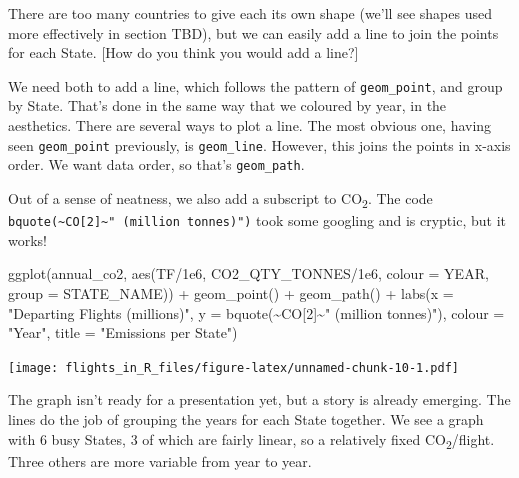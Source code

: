 \documentclass[
]{book}
\newenvironment{Shaded}{\begin{snugshade}}{\end{snugshade}}
\newcommand{\AttributeTok}[1]{\textcolor[rgb]{0.77,0.63,0.00}{#1}}
\newcommand{\DecValTok}[1]{\textcolor[rgb]{0.00,0.00,0.81}{#1}}
\newcommand{\FloatTok}[1]{\textcolor[rgb]{0.00,0.00,0.81}{#1}}
\newcommand{\FunctionTok}[1]{\textcolor[rgb]{0.00,0.00,0.00}{#1}}
\newcommand{\NormalTok}[1]{#1}
\newcommand{\SpecialCharTok}[1]{\textcolor[rgb]{0.00,0.00,0.00}{#1}}
\newcommand{\StringTok}[1]{\textcolor[rgb]{0.31,0.60,0.02}{#1}}
\begin{document}
There are too many countries to give each its own shape (we'll see shapes used more effectively in section TBD), but we can easily add a line to join the points for each State. {[}How do you think you would add a line?{]}

We need both to add a line, which follows the pattern of \texttt{geom\_point}, and group by State. That's done in the same way that we coloured by year, in the aesthetics. There are several ways to plot a line. The most obvious one, having seen \texttt{geom\_point} previously, is \texttt{geom\_line}. However, this joins the points in x-axis order. We want data order, so that's \texttt{geom\_path}.

Out of a sense of neatness, we also add a subscript to CO\textsubscript{2}. The code \texttt{bquote(\textasciitilde{}CO{[}2{]}\textasciitilde{}"\ (million\ tonnes)")} took some googling and is cryptic, but it works!

\begin{Shaded}
\begin{Highlighting}[]
\FunctionTok{ggplot}\NormalTok{(annual\_co2, }\FunctionTok{aes}\NormalTok{(TF}\SpecialCharTok{/}\FloatTok{1e6}\NormalTok{, CO2\_QTY\_TONNES}\SpecialCharTok{/}\FloatTok{1e6}\NormalTok{, }
                         \AttributeTok{colour =}\NormalTok{ YEAR, }\AttributeTok{group =}\NormalTok{ STATE\_NAME)) }\SpecialCharTok{+}
  \FunctionTok{geom\_point}\NormalTok{() }\SpecialCharTok{+} 
  \FunctionTok{geom\_path}\NormalTok{() }\SpecialCharTok{+}
  \FunctionTok{labs}\NormalTok{(}\AttributeTok{x =} \StringTok{"Departing Flights (millions)"}\NormalTok{, }
       \AttributeTok{y =} \FunctionTok{bquote}\NormalTok{(}\SpecialCharTok{\textasciitilde{}}\NormalTok{CO[}\DecValTok{2}\NormalTok{]}\SpecialCharTok{\textasciitilde{}}\StringTok{" (million tonnes)"}\NormalTok{),}
       \AttributeTok{colour =} \StringTok{"Year"}\NormalTok{,}
       \AttributeTok{title =} \StringTok{"Emissions per State"}\NormalTok{)}
\end{Highlighting}
\end{Shaded}

\texttt{[image: flights\_in\_R\_files/figure-latex/unnamed-chunk-10-1.pdf]}

The graph isn't ready for a presentation yet, but a story is already emerging. The lines do the job of grouping the years for each State together. We see a graph with 6 busy States, 3 of which are fairly linear, so a relatively fixed CO\textsubscript{2}/flight. Three others are more variable from year to year.
\end{document}
